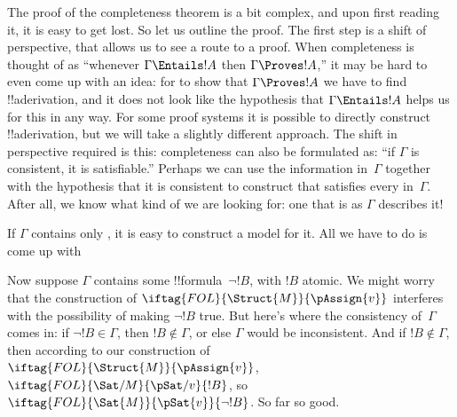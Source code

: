 \documentclass[../../../include/open-logic-section]{subfiles}
\begin{document}
      {}
      {}


The proof of the completeness theorem is a bit complex, and upon first
reading it, it is easy to get lost.  So let us outline the proof.  The
first step is a shift of perspective, that allows us to see a route to
a proof.  When completeness is thought of as ``whenever $\Gamma
\Entails !A$ then $\Gamma \Proves !A$,'' it may be hard to even come
up with an idea: for to show that $\Gamma \Proves !A$ we have to find
!!a{derivation}, and it does not look like the hypothesis that
$\Gamma \Entails !A$ helps us for this in any way.  For some proof
systems it is possible to directly construct !!a{derivation}, but we
will take a slightly different approach.  The shift in perspective
required is this: completeness can also be formulated as: ``if
$\Gamma$ is consistent, it is satisfiable.''  Perhaps we can use the
information in~$\Gamma$ together with the hypothesis that it is
consistent to construct 
that satisfies every 
in~$\Gamma$.  After all, we know
what kind of  we are looking
for: one that is as $\Gamma$ describes it!{}

If $\Gamma$ contains only , it is easy to construct
a model for it. All we have to do is come up with

Now suppose $\Gamma$ contains some !!{formula}~$\lnot !B$, with $!B$
atomic.  We might worry that the construction of
$\iftag{FOL}{\Struct{M}}{\pAssign{v}}$ interferes with the possibility
of making $\lnot !B$ true.  But here's where the consistency
of~$\Gamma$ comes in: if $\lnot !B \in \Gamma$, then $!B \notin
\Gamma$, or else $\Gamma$ would be inconsistent.  And if $!B \notin
\Gamma$, then according to our construction
of~$\iftag{FOL}{\Struct{M}}{\pAssign{v}}$,
$\iftag{FOL}{\Sat/{M}}{\pSat/{v}}{!B}$, so
$\iftag{FOL}{\Sat{M}}{\pSat{v}}{\lnot !B}$.  So far so good.
\end{document}
